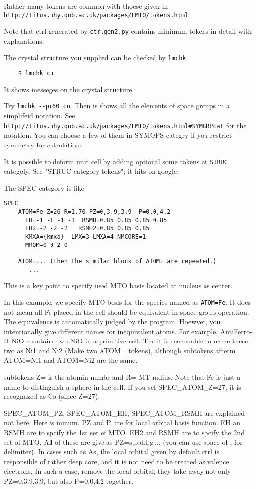 \documentclass[a4paper,10pt,epsf,fleqn]{article}
\begin{document}
Rather many tokens are common with thoese given in 
\verb+http://titus.phy.qub.ac.uk/packages/LMTO/tokens.html+

Note that ctrl generated by  \verb+ctrlgen2.py+ contains
minimum tokens in detail with explanations.

The crystal structure you supplied can be  checked by 
\verb+lmchk+ 
\begin{verbatim}
    $ lmchk cu
\end{verbatim}
It shows messeges on the crystal structure.

Try \verb+lmchk --pr60 cu+. Then is shows
all the elements of space groups in a simplifeid notation.
See \verb+http://titus.phy.qub.ac.uk/packages/LMTO/tokens.html#SYMGRPcat+ for
the notation. You can choose a few of them in SYMOPS categry if you
restrict symmetry for calculations.

It is possible to deform unit cell by adding optional some tokens at
\verb+STRUC+ categoly. See "STRUC category tokens"; it hits on google.

The SPEC category is like
\begin{verbatim}
SPEC                                                            
    ATOM=Fe Z=26 R=1.70 PZ=0,3.9,3.9  P=0,0,4.2               
      EH=-1 -1 -1 -1  RSMH=0.85 0.85 0.85 0.85          
      EH2=-2 -2 -2   RSMH2=0.85 0.85 0.85
      KMXA={kmxa}  LMX=3 LMXA=4 NMCORE=1                        
      MMOM=0 0 2 0                                                    
  
    ATOM=... (then the similar block of ATOM= are repeated.)
       ...
\end{verbatim}
This is a key point to specify used MTO basis 
located at nucleus as center. 

In this example, we specify MTO besis for the species named as
\verb+ATOM=Fe+. It does not mean all Fe placed in the cell should be
equivalent in space group operation. The equivalence is automatically
judged by the program. Hoewver, you intentionally give different names
for inequivalent atoms. For example, AntiFerro-II NiO conatains 
two NiO in a primitive cell. The it is reaconable to name these two
as Ni1 and Ni2 (Make two ATOM= tokens), although subtokens afterm
ATOM=Ni1 and ATOM=Ni2 are the same.

subtokens Z= is the atomin numbr and R= MT radius.
Note that Fe is just a name to distinguish a sphere in the cell.
If you set SPEC\_ATOM\_Z=27, it is recognazed as Co (since Z=27). 

SPEC\_ATOM\_PZ, SPEC\_ATOM\_EH, SPEC\_ATOM\_RSMH are explained not 
here. Here is minum.
PZ and P are for local orbital basis function.
EH an RSMH are to spcify the 1st set of  MTO.
EH2 and RSMH are to spcify the 2nd set of  MTO.
All of these are give as PZ=s,p,d,f,g,...
(you can use space of , for delimiter).
In cases such as As, the local orbital given by default ctrl
is responsible of rather deep core, and it is not need to be treated 
as valence electrons. In such a case,
remove the local orbital; they take away not only PZ=0,3.9,3.9, 
but also P=0,0,4.2 together.
\end{document}

